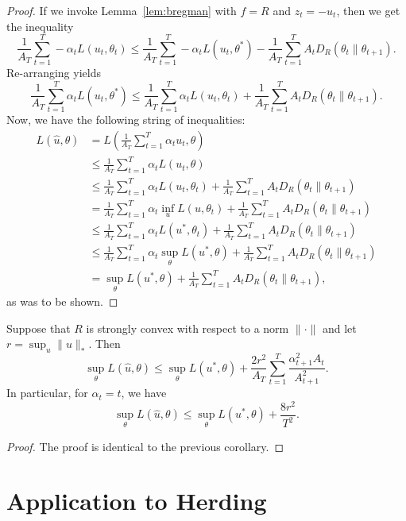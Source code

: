 \documentclass{article}
\begin{document}
\begin{proof}
If we invoke Lemma~\ref{lem:bregman} with $f=R$ and $z_t=-u_t$, then we get 
the inequality
\[ \frac{1}{A_T} \sum_{t=1}^T -\alpha_t L(u_t, \theta_t) \leq \frac{1}{A_T} \sum_{t=1}^T -\alpha_t L(u_t, \theta^*) - \frac{1}{A_T} \sum_{t=1}^T A_tD_R(\theta_t \| \theta_{t+1}). \]
Re-arranging yields
\[ \frac{1}{A_T }\sum_{t=1}^T \alpha_t L(u_t, \theta^*) \leq \frac{1}{A_T} \sum_{t=1}^T \alpha_t L(u_t, \theta_t) + \frac{1}{A_T} \sum_{t=1}^T A_tD_R(\theta_t \| \theta_{t+1}). \]
Now, we have the following string of inequalities:
\begin{align*}
L(\hat{u}, \theta) &= L\left(\frac{1}{A_T} \sum_{t=1}^T \alpha_t u_t, \theta\right) \\
 &\leq \frac{1}{A_T} \sum_{t=1}^T \alpha_t L(u_t, \theta) \\
 &\leq \frac{1}{A_T} \sum_{t=1}^T \alpha_t L(u_t, \theta_t) + \frac{1}{A_T} \sum_{t=1}^T A_t D_R(\theta_t \| \theta_{t+1}) \\
 &= \frac{1}{A_T} \sum_{t=1}^T \alpha_t \inf_{u} L(u, \theta_t) + \frac{1}{A_T} \sum_{t=1}^T A_tD_R(\theta_t \| \theta_{t+1}) \\
 &\leq \frac{1}{A_T} \sum_{t=1}^T \alpha_t L(u^*, \theta_t) + \frac{1}{A_T} \sum_{t=1}^T A_tD_R(\theta_t \| \theta_{t+1}) \\
 &\leq \frac{1}{A_T} \sum_{t=1}^T \alpha_t \sup_{\theta} L(u^*, \theta) + \frac{1}{A_T} \sum_{t=1}^T A_tD_R(\theta_t \| \theta_{t+1}) \\
 &= \sup_{\theta} L(u^*, \theta) + \frac{1}{A_T} \sum_{t=1}^T A_tD_R(\theta_t \| \theta_{t+1}),
\end{align*}
as was to be shown.
\end{proof}
\begin{corollary}
\label{cor:method-2}
Suppose that $R$ is strongly convex with respect to a norm $\|\cdot\|$ 
and let $r = \sup_{u} \|u\|_{*}$. Then 
\[ \sup_{\theta} L(\hat{u}, \theta) \leq \sup_{\theta} L(u^*, \theta) + \frac{2r^2}{A_T} \sum_{t=1}^T \frac{\alpha_{t+1}^2A_t}{A_{t+1}^2}. \]
In particular, for $\alpha_t = t$, we have
\[ \sup_{\theta} L(\hat{u}, \theta) \leq \sup_{\theta} L(u^*, \theta) + \frac{8r^2}{T^2}. \]
\end{corollary}
\begin{proof}
The proof is identical to the previous corollary.
\end{proof}

\section{Application to Herding}
\label{sec:herding}
\end{document}
